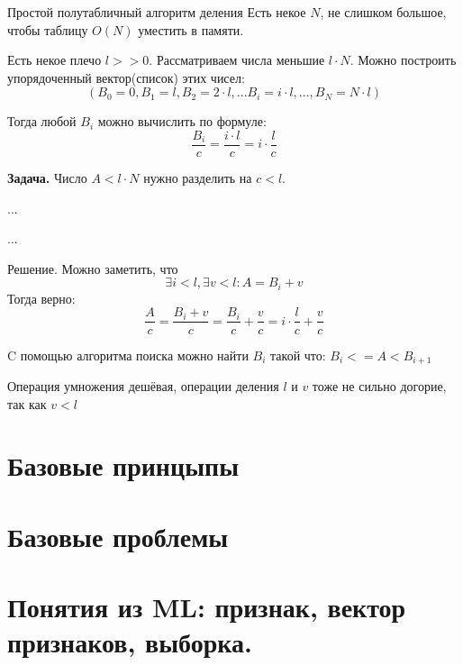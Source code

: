 \begin{frame}{Простой полутабличный алгоритм деления}\label{frame:example_table_method}
	Есть некое $N$, не слишком большое, чтобы таблицу $O(N)$ уместить в памяти.
	
	Есть некое плечо $l>>0$. Рассматриваем числа меньшие $l \cdot N$. 
	Можно построить упорядоченный вектор(список) этих чисел:
	\begin{equation}\label{eq:example_table_method_vector_def}
	(B_0=0, B_1 = l, B_2 = 2 \cdot l, ... B_i = i \cdot l, ..., B_N = N \cdot l )
	\end{equation} 
	
	Тогда любой $B_i$ можно вычислить по формуле:
	\begin{equation}\label{eq:example_table_method_B_i}
	\frac{B_i}{c} = \frac{i \cdot l}{c} = i \cdot \frac{l}{c}
	\end{equation}
	
	
 
 	\textbf{Задача.} Число $A < l \cdot N$ нужно разделить на $c<l$.
	
	...
\end{frame}
\begin{frame}
 	...
 	
 	Решение. Можно заметить, что 
 	\begin{equation}
 	\exists i<l, \exists v<l: A = B_i+v
 	\end{equation}
 	Тогда верно:
 	\begin{equation}
 	\frac{A}{c} = \frac{B_i+v}{c} = \frac{B_i}{c} + \frac{v}{c} = i \cdot \frac{l}{c} + \frac{v}{c}
 	\end{equation}
 	
 	C помощью алгоритма поиска можно найти $B_i$ такой что: $B_i <= A < B_{i+1}$ %
 	
 	Операция умножения дешёвая, операции деления $l$ и $v$ тоже не сильно догорие, 
 	так как $v<l$
 	
 	
 
		
	
\end{frame}

\section{Базовые принцыпы}\label{section:base_principles}

\section{Базовые проблемы}\label{sections:base_problems}






\section{Понятия из ML: признак, вектор признаков, выборка.}\label{section:ml_defs}



